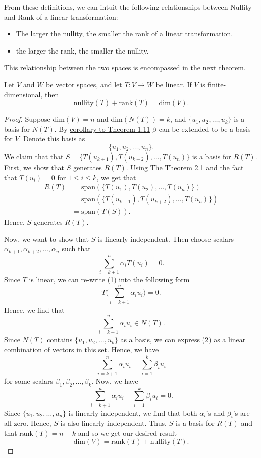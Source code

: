From these definitions, we can intuit the following relationships between Nullity and Rank of a linear transformation:
\begin{itemize}
    \item The larger the nullity, the smaller the rank of a linear transformation.
    \item the larger the rank, the smaller the nullity.
\end{itemize}
This relationship between the two spaces is encompassed in the next theorem.

\begin{theorem}\label{Dimension Theorem}
   Let \( V  \) and \( W  \) be vector spaces, and let \( T: V \to W  \) be linear. If \( V  \) is finite-dimensional, then  
   \[ \text{nullity}(T) + \text{rank}(T) = \text{dim}(V).  \]
\end{theorem}
\begin{proof}
Suppose \( \text{dim}(V) = n  \) and \( \text{dim}(N(T)) = k  \), and \( \{ u_{1}, u_{2}, \dots, u_{k } \}  \) is a basis for \( N(T) \). By {\hyperref[Corollary to Theorem 1.11]{corollary to Theorem 1.11}} \( \beta \) can be extended to be a basis for \( V  \). Denote this basis as 
\[ \{ u_{1}, u_{2}, \dots, u_{n} \}.  \]
We claim that that \( S = \{ T(u_{k+1}), T(u_{k+2}), \dots, T(u_{n})  \}  \) is a basis for \( R(T) \).
First, we show that \( S  \) generates \( R(T) \). Using The {\hyperref[Spanning set for R(T)]{Theorem 2.1}} and the fact that \( T(u_{i}) = 0  \) for \( 1 \leq i \leq k  \), we get that 
\begin{align*}
    R(T) &= \text{span}(\{ T(u_{1}), T(u_{2}), \dots, T(u_{n}) \} ) \\
         &= \text{span}(\{T(u_{k+1}), T(u_{k+2}), \dots, T(u_{n})  \} )\\
         &= \text{span}(T(S)) .
\end{align*}
Hence, \( S  \) generates \( R(T) \).

Now, we want to show that \( S \) is linearly independent. Then choose scalars \( \alpha_{k+1}, \alpha_{k+2}, \dots, \alpha_{n} \) such that 
\[  \sum_{ i=k+1 }^{ n } \alpha_{i} T(u_{i}) = 0.  \tag{1} \]
Since \( T  \) is linear, we can re-write (1) into the following form
\[  T \Big( \sum_{ i= k+1  }^{ n } \alpha_{i} u_{i} \Big) = 0.  \]
Hence, we find that
\[  \sum_{ i=k+1 }^{ n }\alpha_{i} u_{i} \in N(T).\tag{2} \]
Since \( N(T) \) contains \( \{ u_{1}, u_{2}, \dots, u_{k} \}  \) as a basis, we can express (2) as a linear combination of vectors in this set. Hence, we have
\[  \sum_{ i=k+1 }^{ n } \alpha_{i} u_{i} = \sum_{ i=1 }^{ k  } \beta_{i} u_{i} \tag{3} \]
for some scalars \( \beta_{1}, \beta_{2}, \dots, \beta_{k} \).
Now, we have
\[  \sum_{ i=k+1 }^{ n } \alpha_{i} u_{i} - \sum_{ i=1 }^{ k  } \beta_{i} u_{i} = 0. \]
Since \( \{ u_{1}, u_{2}, \dots, u_{n}  \}   \) is linearly independent, we find that both \( \alpha_{i} \)'s and \( \beta_{i} \)'s are all zero. Hence, \( S  \) is also linearly independent. Thus, \( S  \) is a basis for \( R(T) \) and that \( \text{rank}(T) = n - k  \) and so we get our desired result
\[  \text{dim}(V) = \text{rank}(T) + \text{nullity}(T). \]
\end{proof}

